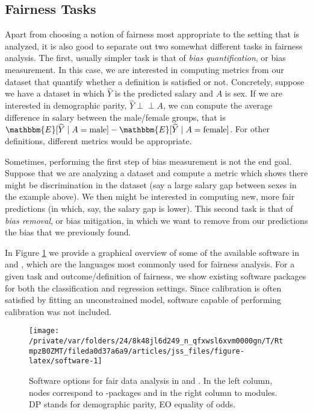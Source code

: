 \documentclass[
  nojss]{jss}
\begin{document}
\hypertarget{fairness-tasks}{%
\subsection{Fairness Tasks}\label{fairness-tasks}}

Apart from choosing a notion of fairness most appropriate to the setting
that is analyzed, it is also good to separate out two somewhat different
tasks in fairness analysis. The first, usually simpler task is that of
\emph{bias quantification}, or bias measurement. In this case, we are
interested in computing metrics from our dataset that quantify whether a
definition is satisfied or not. Concretely, suppose we have a dataset in
which \(\widehat{Y}\) is the predicted salary and \(A\) is sex. If we
are interested in demographic parity,
\(\widehat{Y} {\perp\!\!\!\perp}A\), we can compute the average
difference in salary between the male/female groups, that is
\(\mathbbm{E}[\widehat{Y} \mid A = \text{male}] - \mathbbm{E}[\widehat{Y} \mid A = \text{female}]\).
For other definitions, different metrics would be appropriate.

Sometimes, performing the first step of bias measurement is not the end
goal. Suppose that we are analyzing a dataset and compute a metric which
shows there might be discrimination in the dataset (say a large salary
gap between sexes in the example above). We then might be interested in
computing new, more fair predictions (in which, say, the salary gap is
lower). This second task is that of \emph{bias removal}, or bias
mitigation, in which we want to remove from our predictions the bias
that we previously found.

In Figure \ref{fig:software} we provide a graphical overview of some of
the available software in  and , which are
the languages most commonly used for fairness analysis. For a given task
and outcome/definition of fairness, we show existing software packages
for both the classification and regression settings. Since calibration
is often satisfied by fitting an unconstrained model, software capable
of performing calibration was not included.

\begin{CodeChunk}
\begin{figure}

{\centering \texttt{[image: /private/var/folders/24/8k48jl6d249\_n\_qfxwsl6xvm0000gn/T/RtmpzB0ZMT/fileda0d37a6a9/articles/jss\_files/figure-latex/software-1]} 

}

\caption{Software options for fair data analysis in  and . In the left column, nodes correspond to -packages and in the right column to  modules. DP stands for demographic parity, EO equality of odds.}\label{fig:software}
\end{figure}
\end{CodeChunk}
\end{document}
